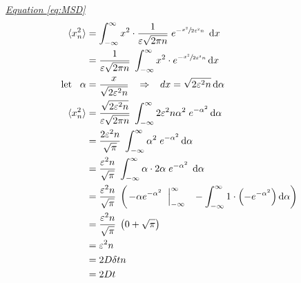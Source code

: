 \documentclass[a4paper, parskip=half]{scrartcl}
\newcommand{\diff}{\mathop{}\!\mathrm{d}}
\newcommand{\myEqRef}[1]{\textit{\hyperref[eq:#1]{Equation \ref*{eq:#1}}}}
\begin{document}
\myEqRef{MSD}
\begin{align}
\langle x_n^2\rangle &= \int_{-\infty}^\infty x^2 \cdot \frac{1}{\varepsilon\sqrt{2\pi n}}\; e^{-\sfrac{x^2}{2\varepsilon^2 n}}\; \diff x\\
&= \frac{1}{\varepsilon\sqrt{2\pi n}} \; \int_{-\infty}^\infty x^2 \cdot e^{-\sfrac{x^2}{2\varepsilon^2 n}} \diff x \\
\mathrm{let}\;\;\; \alpha &= \frac{x}{\sqrt{2\varepsilon^2n}} \;\;\; \Rightarrow \;\;\; dx = \sqrt{2\varepsilon^2n}\diff\alpha\\
\langle x_n^2\rangle &= \frac{\sqrt{2\varepsilon^2n}}{\varepsilon\sqrt{2\pi n}} \; \int_{-\infty}^\infty 2 \varepsilon^2n\alpha^2\; e^{-\alpha^2} \diff\alpha\\
&= \frac{2\varepsilon^2n}{\sqrt{\pi}} \; \int_{-\infty}^\infty \alpha^2\; e^{-\alpha^2} \diff \alpha\\
&= \frac{\varepsilon^2n}{\sqrt{\pi}} \; \int_{-\infty}^\infty \alpha \cdot 2\alpha\; e^{-\alpha^2}\; \diff\alpha\\
&= \frac{\varepsilon^2n}{\sqrt{\pi}} \; \left(\left.-\alpha e^{-\alpha^2}\;\; \right|_{-\infty}^\infty \;\;\; - \int_{-\infty}^\infty 1 \cdot \left(-e^{-\alpha^2} \right) \diff\alpha\right) \\
&= \frac{\varepsilon^2n}{\sqrt{\pi}} \; \left(0 + \sqrt{\pi} \right)\\
&= \varepsilon^2 n \\
&= 2 D \delta t n \\
&= 2 D t
\end{align}
\end{document}

